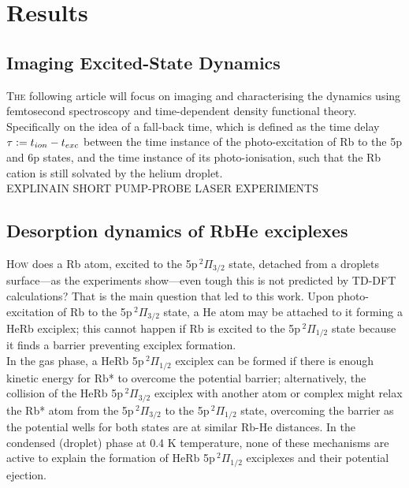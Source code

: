 \chapter{Results}
	\section{Imaging Excited-State Dynamics}
		\lettrine[lines=3,findent=3pt,nindent=0pt]{T}{he} following article will focus on imaging and characterising the dynamics using femtosecond spectroscopy and time-dependent density functional theory. Specifically on the idea of a fall-back time, which is defined as the time delay $\tau\vcentcolon=t_{ion}-t_{exc}$ between the time instance of the photo-excitation of Rb to the 5p and 6p states, and the time instance of its photo-ionisation, such that the Rb cation is still solvated by the helium droplet.\\
		
		EXPLINAIN SHORT PUMP-PROBE LASER EXPERIMENTS
		
		
		\cleardoublepage

	\section{Desorption dynamics of RbHe exciplexes}
		\lettrine[lines=3,findent=3pt,nindent=0pt]{H}{ow} does a Rb atom, excited to the 5p$\,^2\Pi_{3/2}$ state, detached from a droplets surface---as the experiments show---even tough this is not predicted by TD-DFT calculations? That is the main question that led to this work. Upon photo-excitation of Rb to the 5p$\,^2\Pi_{3/2}$ state, a He atom may be attached to it forming a HeRb exciplex; this cannot happen if Rb is excited to the 5p$\,^2\Pi_{1/2}$ state because it finds a barrier preventing exciplex formation.\\
		
		In the gas phase, a HeRb 5p$\,^2\Pi_{1/2}$ exciplex can be formed if there is enough kinetic energy for Rb* to overcome the potential barrier; alternatively, the collision of the HeRb 5p$\,^2\Pi_{3/2}$ exciplex with another atom or complex might relax the Rb* atom from the 5p$\,^2\Pi_{3/2}$ to the 5p$\,^2\Pi_{1/2}$ state, overcoming the barrier as the potential wells for both states are at similar Rb-He distances. In the condensed (droplet) phase at 0.4 K temperature, none of these mechanisms are active to explain the formation of HeRb 5p$\,^2\Pi_{1/2}$ exciplexes and their potential ejection.\\

